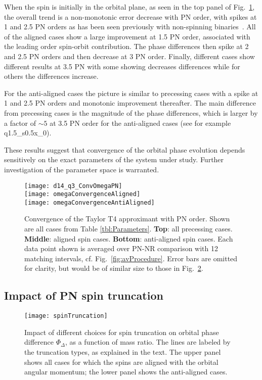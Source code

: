 \documentclass[aps,prd,amsmath,floatfix,twocolumn,superscriptaddress,nofootinbib,showpacs]{revtex4-1}
\begin{document}
When the spin is initially in the orbital plane, as seen in the top
panel of Fig.~\ref{fig:q3_OmegaConv}, the overall trend is a
non-monotonic error decrease with PN order, with spikes at 1 and 2.5
PN orders as has been seen previously with non-spinning
binaries~\cite{Boyle2007}.  All of the aligned cases show a large
improvement at 1.5 PN order, associated with the leading order
spin-orbit contribution. The phase differences then spike at 2 and 2.5
PN orders and then decrease at 3 PN order. Finally, different cases
show different results at 3.5 PN with some showing decreases
differences while for others the differences increase.%

For the anti-aligned cases the picture is similar to precessing cases
with a spike at 1 and 2.5 PN orders and monotonic improvement
thereafter. The main difference from precessing cases is the magnitude
of the phase differences, which is larger by a factor of $\sim 5$ at
3.5 PN order for the anti-aligned cases (see for example
q1.5\_s0.5x\_0).%

These results suggest that convergence of the orbital phase evolution
depends sensitively on the exact parameters of the system under study.
Further investigation of the parameter space is warranted.


\begin{figure}
  \texttt{[image: d14\_q3\_ConvOmegaPN]}\\
  \texttt{[image: omegaConvergenceAligned]}\\
   \texttt{[image: omegaConvergenceAntiAligned]}
   \caption{Convergence of the Taylor T4 approximant with PN
     order. Shown are all cases from Table \ref{tbl:Parameters}. {\bf
       Top}: all precessing cases. {\bf Middle}: aligned spin
     cases. {\bf Bottom}: anti-aligned spin cases.  Each data point
     shown is averaged over PN-NR comparison with 12 matching
     intervals, cf. Fig.~\ref{fig:avProcedure}.  Error bars are
     omitted for clarity, but would be of similar size to those in
     Fig.~\ref{fig:spinTruncationSummary}.}
  \label{fig:q3_OmegaConv}
\end{figure}


\subsection{Impact of PN spin truncation}
\label{sec:ChangeSpinTruncation}
\begin{figure}
  \texttt{[image: spinTruncation]}
  \caption{Impact of different choices for spin truncation on orbital
    phase difference $\Phi_{\Delta}$, as a function of mass ratio.
    The lines are labeled by the truncation types, as explained in the
    text.  The upper panel shows all cases for which the spins are
    aligned with the orbital angular momentum; the lower panel shows
    the anti-aligned cases.}
  \label{fig:spinTruncationSummary}
\end{figure}
\end{document}
